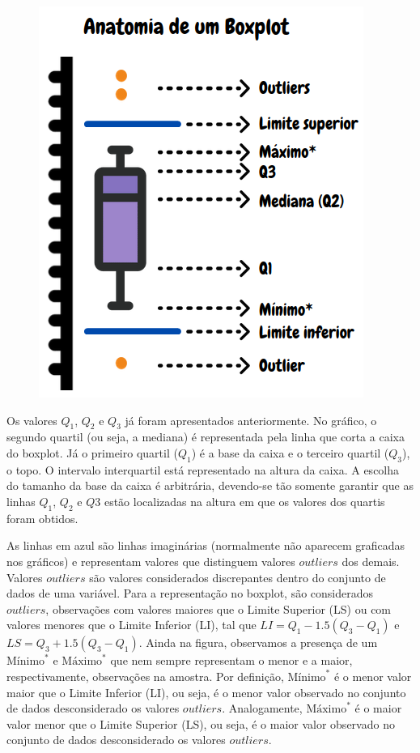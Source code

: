 \documentclass[
  letterpaper,
  DIV=11,
  numbers=noendperiod]{scrreprt}
\begin{document}
\begin{figure}

{\centering \includegraphics{./figuras_descritiva/Boxplot2.png}

}

\end{figure}

Os valores \(Q_1\), \(Q_2\) e \(Q_3\) já foram apresentados
anteriormente. No gráfico, o segundo quartil (ou seja, a mediana) é
representada pela linha que corta a caixa do boxplot. Já o primeiro
quartil (\(Q_1\)) é a base da caixa e o terceiro quartil (\(Q_3\)), o
topo. O intervalo interquartil está representado na altura da caixa. A
escolha do tamanho da base da caixa é arbitrária, devendo-se tão somente
garantir que as linhas \(Q_1\), \(Q_2\) e \(Q3\) estão localizadas na
altura em que os valores dos quartis foram obtidos.

As linhas em azul são linhas imaginárias (normalmente não aparecem
graficadas nos gráficos) e representam valores que distinguem valores
\(outliers\) dos demais. Valores \(outliers\) são valores considerados
discrepantes dentro do conjunto de dados de uma variável. Para a
representação no boxplot, são considerados \(outliers\), observações com
valores maiores que o Limite Superior (LS) ou com valores menores que o
Limite Inferior (LI), tal que \(LI = Q_1 - 1.5 (Q_3 - Q_1)\) e
\(LS = Q_3 + 1.5 (Q_3 - Q_1)\). Ainda na figura, observamos a presença
de um \(\mbox{Mínimo}^*\) e \(\mbox{Máximo}^*\) que nem sempre
representam o menor e a maior, respectivamente, observações na amostra.
Por definição, \(\mbox{Mínimo}^*\) é o menor valor maior que o Limite
Inferior (LI), ou seja, é o menor valor observado no conjunto de dados
desconsiderado os valores \(outliers\). Analogamente,
\(\mbox{Máximo}^*\) é o maior valor menor que o Limite Superior (LS), ou
seja, é o maior valor observado no conjunto de dados desconsiderado os
valores \(outliers\).
\end{document}
